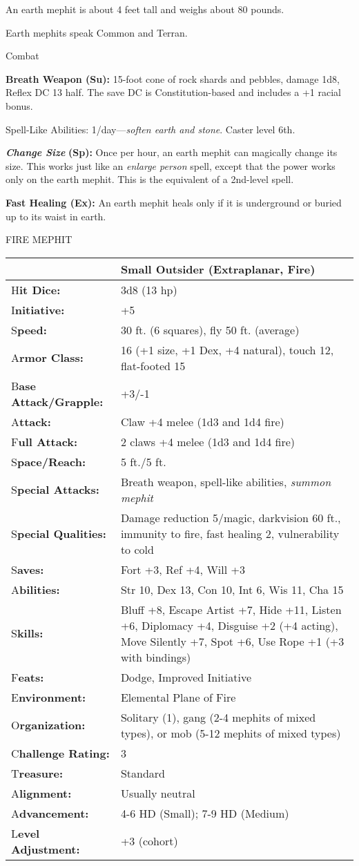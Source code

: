 \documentclass{article}
\begin{document}
An earth mephit is about 4 feet tall and weighs about 80 pounds.

Earth mephits speak Common and Terran.

Combat

\textbf{Breath Weapon (Su):} 15-foot cone of rock shards and pebbles, damage 1d8, 
Reflex DC 13 half. The save DC is Constitution-based and includes a +1 racial bonus.

Spell-Like Abilities: 1/day---\textit{soften earth and stone}. Caster level 6th.

\textit{\textbf{Change Size }}\textbf{(Sp):} Once per hour, an earth mephit can 
magically change its size. This works just like an \textit{enlarge person }spell, 
except that the power works only on the earth mephit. This is the equivalent of 
a 2nd-level spell.

\textbf{Fast Healing (Ex): }An earth mephit heals only if it is underground or 
buried up to its waist in earth.

\vspace{12pt}
FIRE MEPHIT

\begin{tabular}{|>{\raggedright}p{90pt}|>{\raggedright}p{235pt}|}
\hline
  & Small Outsider (Extraplanar, Fire)\tabularnewline
\hline
H\textbf{it Dice:} & 3d8 (13 hp)\tabularnewline
\hline
I\textbf{nitiative:} & +5\tabularnewline
\hline
S\textbf{peed:} & 30 ft. (6 squares), fly 50 ft. (average)\tabularnewline
\hline
A\textbf{rmor Class:} & 16 (+1 size, +1 Dex, +4 natural), touch 12, flat-footed 
15\tabularnewline
\hline
B\textbf{ase Attack/Grapple:} & +3/-1\tabularnewline
\hline
A\textbf{ttack:} & Claw +4 melee (1d3 and 1d4 fire)\tabularnewline
\hline
F\textbf{ull Attack:} & 2 claws +4 melee (1d3 and 1d4 fire)\tabularnewline
\hline
S\textbf{pace/Reach:} & 5 ft./5 ft.\tabularnewline
\hline
S\textbf{pecial Attacks:} & Breath weapon, spell-like abilities, \textit{summon 
mephit}\tabularnewline
\hline
S\textbf{pecial Qualities:} & Damage reduction 5/magic, darkvision 60 ft., immunity 
to fire, fast healing 2, vulnerability to cold\tabularnewline
\hline
S\textbf{aves:} & Fort +3, Ref +4, Will +3\tabularnewline
\hline
A\textbf{bilities:} & Str 10, Dex 13, Con 10, Int 6, Wis 11, Cha 15\tabularnewline
\hline
S\textbf{kills:} & Bluff +8, Escape Artist +7, Hide +11, Listen +6, Diplomacy +4, 
Disguise +2 (+4 acting), Move Silently +7, Spot +6, Use Rope +1 (+3 with bindings)\tabularnewline
\hline
F\textbf{eats:} & Dodge, Improved Initiative\tabularnewline
\hline
E\textbf{nvironment:} & Elemental Plane of Fire\tabularnewline
\hline
O\textbf{rganization:} & Solitary (1), gang (2-4 mephits of mixed types), or mob 
(5-12 mephits of mixed types)\tabularnewline
\hline
C\textbf{hallenge Rating:} & 3\tabularnewline
\hline
T\textbf{reasure:} & Standard\tabularnewline
\hline
A\textbf{lignment:} & Usually neutral\tabularnewline
\hline
A\textbf{dvancement:} & 4-6 HD (Small); 7-9 HD (Medium)\tabularnewline
\hline
L\textbf{evel Adjustment:} & +3 (cohort)\tabularnewline
\hline
\end{tabular}
\end{document}
